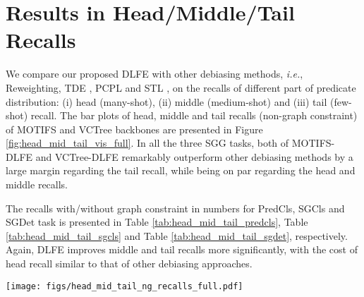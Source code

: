 \documentclass[sigconf]{acmart}
\begin{document}
\section{Results in Head/Middle/Tail Recalls}
\label{sec:appendix_results_in_head_mid_tail}
We compare our proposed DLFE with other debiasing methods, \emph{i.e.}, Reweighting, TDE \cite{tang2020unbiased}, PCPL \cite{yan2020pcpl} and STL \cite{chen2019soft}, on the recalls of different part of predicate distribution: (i) head (many-shot), (ii) middle (medium-shot) and (iii) tail (few-shot) recall.
The bar plots of head, middle and tail recalls (non-graph constraint) of MOTIFS and VCTree backbones are presented in Figure \ref{fig:head_mid_tail_vis_full}.
In all the three SGG tasks, both of MOTIFS-DLFE and VCTree-DLFE remarkably outperform other debiasing methods by a large margin regarding the tail recall, while being on par regarding the head and middle recalls.

The recalls with/without graph constraint in numbers for PredCls, SGCls and SGDet task is presented in Table \ref{tab:head_mid_tail_predcls}, Table \ref{tab:head_mid_tail_sgcls} and Table \ref{tab:head_mid_tail_sgdet}, respectively.
Again, DLFE improves middle and tail recalls more significantly, with the cost of head recall similar to that of other debiasing approaches.

\begin{figure*}[t!]
\begin{center}
\texttt{[image: figs/head\_mid\_tail\_ng\_recalls\_full.pdf]}
\end{center}
\vspace{-1em}
  \caption{Bar plots of head (many shot), middle (medium shot) and tail (few shot) classes based on either MOTIFS (left) and VCTree (right) backbone, evaluated on VG150. From top to down is results in PredCls, SGCls and SGDet, respectively.}
\label{fig:head_mid_tail_vis_full}
\end{figure*}
\end{document}
